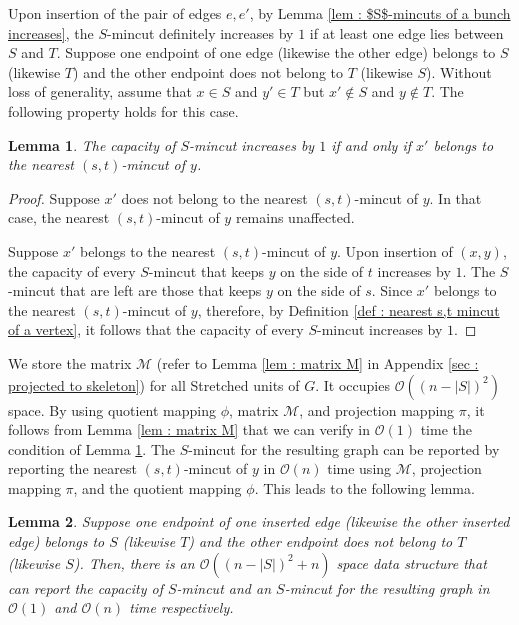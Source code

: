 \documentclass[letterpaper,11pt]{article}
\newtheorem{lemma}{Lemma}[]
\begin{document}
Upon insertion of the pair of edges $e,e'$, by Lemma \ref{lem : $S$-mincuts of a bunch increases}, the $S$-mincut definitely increases by $1$ if at least one edge lies between $S$ and $T$. Suppose one endpoint of one edge (likewise the other edge) belongs to $S$ (likewise $T$) and the other endpoint does not belong to $T$ (likewise $S$). Without loss of generality, assume that  $x\in S$ and $y'\in T$ but $x'\notin S$ and $y\notin T$. The following property holds for this case. \begin{lemma} \label{lem : belong to nearest cut}
    The capacity of $S$-mincut increases by $1$ if and only if $x'$ belongs to the nearest $(s,t)$-mincut of $y$.
\end{lemma}
\begin{proof}
    Suppose $x'$ does not belong to the nearest $(s,t)$-mincut of $y$. In that case, the nearest $(s,t)$-mincut of $y$ remains unaffected.

    Suppose $x'$ belongs to the nearest $(s,t)$-mincut of $y$. Upon insertion of $(x,y)$, the capacity of every $S$-mincut that keeps $y$ on the side of $t$ increases by $1$. The $S$-mincut that are left are those that keeps $y$ on the side of $s$. Since $x'$ belongs to the nearest $(s,t)$-mincut of $y$, therefore, by Definition \ref{def : nearest s,t mincut of a vertex}, it follows that the capacity of every $S$-mincut increases by $1$.
\end{proof}
We store the matrix ${\mathcal M}$ (refer to Lemma \ref{lem : matrix M} in Appendix \ref{sec : projected to skeleton}) for all Stretched units of $G$. It occupies ${\mathcal O}((n-|S|)^2)$ space. By using quotient mapping $\phi$, matrix ${\mathcal M}$, and projection mapping $\pi$, it follows from Lemma \ref{lem : matrix M} that we can verify in ${\mathcal O}(1)$ time the condition of Lemma \ref{lem : belong to nearest cut}. The $S$-mincut for the resulting graph can be reported by reporting the nearest $(s,t)$-mincut of $y$ in ${\mathcal O}(n)$ time using ${\mathcal M}$, projection mapping $\pi$, and the quotient mapping $\phi$. This leads to the following lemma.
\begin{lemma} \label{lem : increase by 1 when in nearest cut of a vertex}
    Suppose one endpoint of one inserted edge (likewise the other inserted edge) belongs to $S$ (likewise $T$) and the other endpoint does not belong to $T$ (likewise $S$). Then, there is an ${\mathcal O}((n-|S|)^2+n)$ space data structure that can report the capacity of $S$-mincut and an $S$-mincut for the resulting graph in ${\mathcal O}(1)$ and ${\mathcal O}(n)$ time respectively.
\end{lemma}
\end{document}
